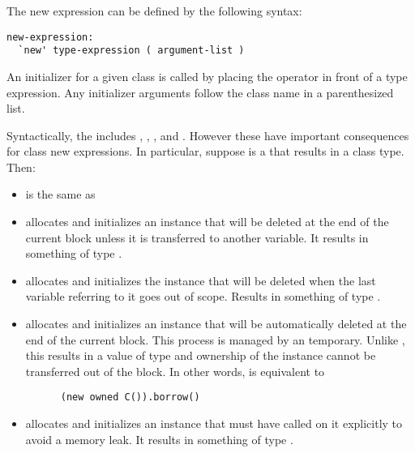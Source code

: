 The new expression can be defined by the following syntax:

\begin{syntax}
\begin{verbatim}
new-expression:
  `new' type-expression ( argument-list )
\end{verbatim}
\end{syntax}

An initializer for a given class is called by placing the 
operator in front of a type expression. Any initializer arguments follow
the class name in a parenthesized list.

Syntactically, the  includes ,
, , and . However these have
important consequences for class new expressions. In particular, suppose
 is a  that results in a class type. Then:

\begin{itemize}

  \item {} is the same as 

  \item {} allocates and initializes an instance that
    will be deleted at the end of the current block unless it is
    transferred to another  variable. It results in something
    of type .

  \item {} allocates and initializes the instance that
    will be deleted when the last  variable referring to it
    goes out of scope. Results in something of type .

  \item {} allocates and initializes an instance
    that will be automatically deleted at the end of the current block.
    This process is managed by an  temporary.  Unlike
    , this results in a value of type 
    and ownership of the instance cannot be transferred out of the
    block. In other words,  is equivalent to
    \begin{chapel}
      \begin{verbatim}
      (new owned C()).borrow()
      \end{verbatim}
    \end{chapel}

  \item {} allocates and initializes an instance
    that must have  called on it explicitly to avoid a
    memory leak. It results in something of type .

\end{itemize}

